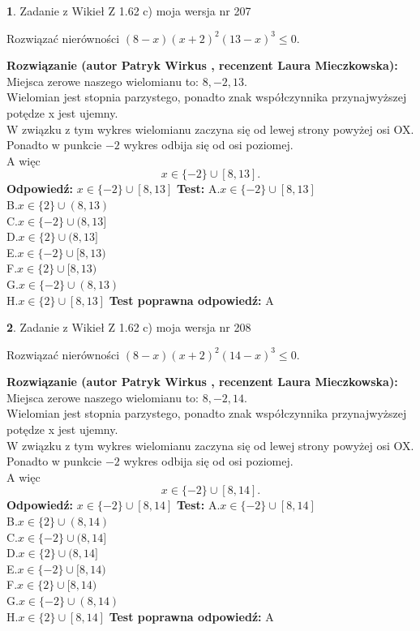 \documentclass[12pt, a4paper]{article}
\theoremstyle{definition} %
\newtheorem{zad}{}
\newcommand{\zadStart}[1]{\begin{zad}#1\newline}
\newcommand{\zadStop}{\end{zad}}
\newcommand{\rozwStart}[2]{\noindent \textbf{Rozwiązanie (autor #1 , recenzent #2): }\newline}
\newcommand{\rozwStop}{\newline}
\newcommand{\odpStart}{\noindent \textbf{Odpowiedź:}\newline}
\newcommand{\odpStop}{\newline}
\newcommand{\testStart}{\noindent \textbf{Test:}\newline}
\newcommand{\testStop}{\newline}
\newcommand{\kluczStart}{\noindent \textbf{Test poprawna odpowiedź:}\newline}
\newcommand{\kluczStop}{\newline}
\begin{document}
\zadStart{Zadanie z Wikieł Z 1.62 c) moja wersja nr 207}

Rozwiązać nierówności $(8-x)(x+2)^{2}(13-x)^{3}\le0$.
\zadStop
\rozwStart{Patryk Wirkus}{Laura Mieczkowska}
Miejsca zerowe naszego wielomianu to: $8, -2, 13$.\\
Wielomian jest stopnia parzystego, ponadto znak współczynnika przy\linebreak najwyższej potędze x jest ujemny.\\ W związku z tym wykres wielomianu zaczyna się od lewej strony powyżej osi OX.\\
Ponadto w punkcie $-2$ wykres odbija się od osi poziomej.\\
A więc $$x \in \{-2\} \cup [8,13].$$
\rozwStop
\odpStart
$x \in \{-2\} \cup [8,13]$
\odpStop
\testStart
A.$x \in \{-2\} \cup [8,13]$\\
B.$x \in \{2\} \cup (8,13)$\\
C.$x \in \{-2\} \cup (8,13]$\\
D.$x \in \{2\} \cup (8,13]$\\
E.$x \in \{-2\} \cup [8,13)$\\
F.$x \in \{2\} \cup [8,13)$\\
G.$x \in \{-2\} \cup (8,13)$\\
H.$x \in \{2\} \cup [8,13]$
\testStop
\kluczStart
A
\kluczStop



\zadStart{Zadanie z Wikieł Z 1.62 c) moja wersja nr 208}

Rozwiązać nierówności $(8-x)(x+2)^{2}(14-x)^{3}\le0$.
\zadStop
\rozwStart{Patryk Wirkus}{Laura Mieczkowska}
Miejsca zerowe naszego wielomianu to: $8, -2, 14$.\\
Wielomian jest stopnia parzystego, ponadto znak współczynnika przy\linebreak najwyższej potędze x jest ujemny.\\ W związku z tym wykres wielomianu zaczyna się od lewej strony powyżej osi OX.\\
Ponadto w punkcie $-2$ wykres odbija się od osi poziomej.\\
A więc $$x \in \{-2\} \cup [8,14].$$
\rozwStop
\odpStart
$x \in \{-2\} \cup [8,14]$
\odpStop
\testStart
A.$x \in \{-2\} \cup [8,14]$\\
B.$x \in \{2\} \cup (8,14)$\\
C.$x \in \{-2\} \cup (8,14]$\\
D.$x \in \{2\} \cup (8,14]$\\
E.$x \in \{-2\} \cup [8,14)$\\
F.$x \in \{2\} \cup [8,14)$\\
G.$x \in \{-2\} \cup (8,14)$\\
H.$x \in \{2\} \cup [8,14]$
\testStop
\kluczStart
A
\kluczStop
\end{document}
